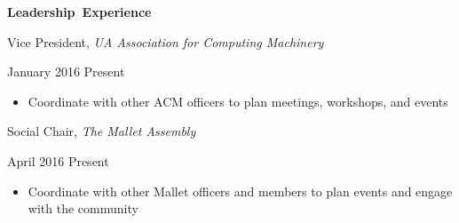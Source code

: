\documentclass[11pt]{article}
\begin{document}
\vspace{0.8em}
\hbox{\large \textbf{Leadership Experience}}

\vspace{0.4em}
\begin{minipage}[t]{0.7\textwidth}
\flushleft
Vice President, \textit{UA Association for Computing Machinery}\\
\end{minipage}
\begin{minipage}[t]{0.25\textwidth}
\flushright
January 2016 \space \textemdash \space Present\\
\end{minipage}

\begin{itemize}
  \item Coordinate with other ACM officers to plan meetings, workshops, and events
\end{itemize}

\vspace{0.4em}
\begin{minipage}[t]{0.7\textwidth}
\flushleft
Social Chair, \textit{The Mallet Assembly}\\
\end{minipage}
\begin{minipage}[t]{0.25\textwidth}
\flushright
April 2016 \space \textemdash \space Present\\
\end{minipage}

\begin{itemize}
  \item Coordinate with other Mallet officers and members to plan events and engage with the community
\end{itemize}
\end{document}
